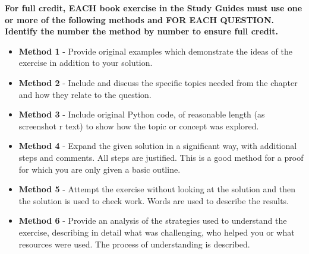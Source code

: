 \textbf{For full credit,  EACH book exercise in the Study Guides must use one or more of the following methods and FOR EACH QUESTION.  Identify the number the method by number to ensure full credit.}

\begin{itemize}
    \item \textbf{Method 1} - Provide original examples which demonstrate the ideas of the exercise in addition to your solution.
    \item \textbf{Method 2} - Include and discuss the specific topics needed from the chapter and how they relate to the question.
    \item \textbf{Method 3} - Include original Python code, of reasonable length (as screenshot r text)  to show how the topic or concept was explored.
    \item \textbf{Method 4} - Expand the given solution in a significant way, with additional steps and comments. All steps are justified. This is a good method for a proof for which you are only given a basic outline.
    \item \textbf{Method 5} - Attempt the exercise without looking at the solution and then the solution is used to check work. Words are used to describe the results.
    \item \textbf{Method 6} - Provide an analysis of the strategies used to understand the exercise, describing in detail what was challenging, who helped you or what resources were used. The process of understanding is
    described.
\end{itemize}


